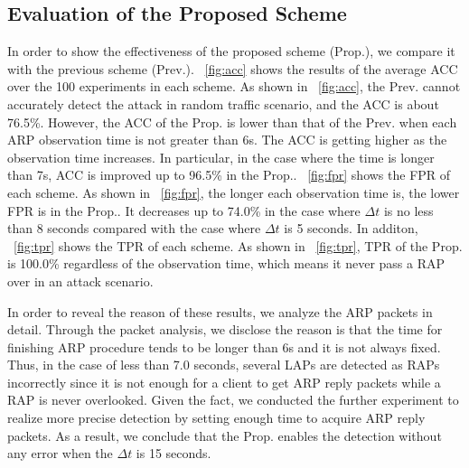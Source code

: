 \documentclass[conference]{IEEEtran}
\begin{document}
\subsection{Evaluation of the Proposed Scheme}
In order to show the effectiveness of the proposed scheme (Prop.), we compare it with the previous scheme \cite{previous} (Prev.).
\figurename~\ref{fig:acc} shows the results of the average ACC over the 100 experiments in each scheme.
As shown in \figurename~\ref{fig:acc}, the Prev. cannot accurately detect the attack in random traffic scenario, and the ACC is about 76.5\%.
However, the ACC of the Prop. is lower than that of the Prev. when each ARP observation time is not greater than 6s.
The ACC is getting higher as the observation time increases.
In particular, in the case where the time is longer than 7s, ACC is improved up to 96.5\% in the Prop..
\figurename~\ref{fig:fpr} shows the FPR of each scheme.
As shown in \figurename~\ref{fig:fpr}, the longer each observation time is, the lower FPR is in the Prop..
It decreases up to 74.0\% in the case where $\Delta t$ is no less than 8 seconds compared with the case where $\Delta t$ is 5 seconds.
In additon, \figurename~\ref{fig:tpr} shows the TPR of each scheme.
As shown in \figurename~\ref{fig:tpr}, TPR of the Prop. is 100.0\% regardless of the observation time, which means it never pass a RAP over in an attack scenario.

In order to reveal the reason of these results, we analyze the ARP packets in detail.
Through the packet analysis, we disclose the reason is that the time for finishing ARP procedure tends to be longer than 6s and it is not always fixed.
Thus, in the case of less than 7.0 seconds, several LAPs are detected as RAPs incorrectly since it is not enough for a client to get ARP reply packets while a RAP is never overlooked.
Given the fact, we conducted the further experiment to realize more precise detection by setting enough time to acquire ARP reply packets.
As a result, we conclude that the Prop. enables the detection without any error when the $\Delta t$ is 15 seconds.
\end{document}
